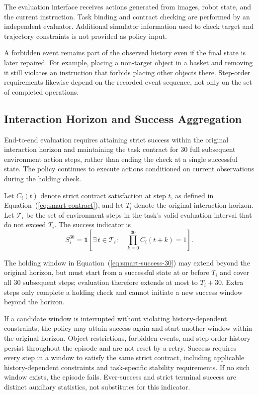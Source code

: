 The evaluation interface receives actions generated from images, robot
state, and the current instruction. Task binding and contract checking
are performed by an independent evaluator. Additional simulator
information used to check target and trajectory constraints is not
provided as policy input.

A forbidden event remains part of the observed history even if the final
state is later repaired. For example, placing a non-target object in a
basket and removing it still violates an instruction that forbids placing
other objects there. Step-order requirements likewise depend on the
recorded event sequence, not only on the set of completed operations.

\subsection{Interaction Horizon and Success Aggregation}
\label{app:smart-aggregation}

End-to-end evaluation requires attaining strict success within the
original interaction horizon and maintaining the task contract for 30
full subsequent environment action steps, rather than ending the check
at a single successful state. The policy continues to execute actions
conditioned on current observations during the holding check.

Let \(C_i(t)\) denote strict contract satisfaction at step \(t\), as
defined in Equation~(\ref{eq:smart-contract}), and let \(T_i\) denote
the original interaction horizon. Let \(\mathcal{T}_i\) be the set of
environment steps in the task's valid evaluation interval that do not
exceed \(T_i\). The success indicator is
\begin{equation}
\label{eq:smart-success-30}
S_i^{30}=\mathbf{1}\!\left[
\exists\,t\in\mathcal{T}_i:\quad
\prod_{k=0}^{30}C_i(t+k)=1
\right].
\end{equation}

The holding window in Equation~(\ref{eq:smart-success-30}) may extend beyond the original horizon,
but must
start from a successful state at or before \(T_i\) and cover all 30
subsequent steps; evaluation therefore extends at most to \(T_i+30\).
Extra steps only complete a holding check and cannot initiate a new
success window beyond the horizon.

If a candidate window is interrupted without violating history-dependent
constraints, the policy may attain success again and start another
window within the original horizon. Object restrictions, forbidden
events, and step-order history persist throughout the episode and are
not reset by a retry. Success requires every step in a window to satisfy
the same strict contract, including applicable history-dependent
constraints and task-specific stability requirements. If no such window
exists, the episode fails. Ever-success and strict terminal success are
distinct auxiliary statistics, not substitutes for this indicator.


